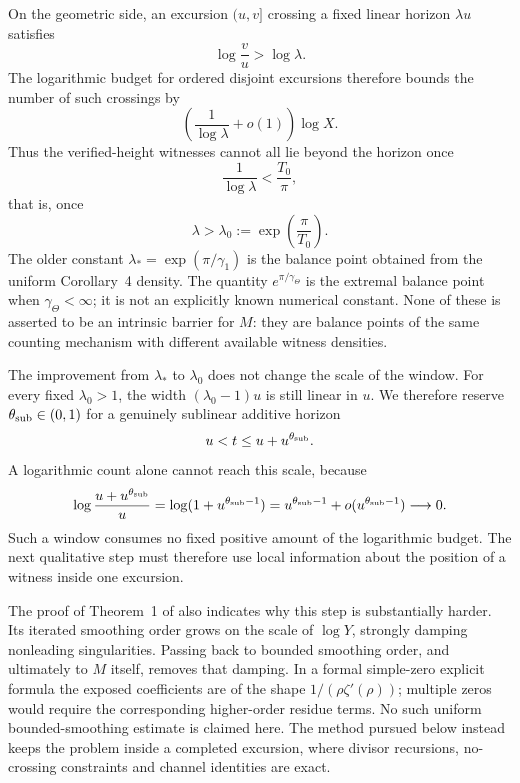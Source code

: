 \documentclass[11pt,reqno]{amsart}
\makeatletter
\let\CG@origcite\cite
\renewcommand*{\cite}[2][]{\def\CG@citekey{#2}%
  \ifx\relax#1\relax\CG@origcite{#2}\else\CG@origcite[#1]{#2}\fi}
\numberwithin{equation}{section}
\theoremstyle{plain}
\theoremstyle{definition}
\theoremstyle{remark}
\makeatother
\begin{document}
On the geometric side, an excursion $(u,v]$ crossing a fixed linear horizon
$\lambda u$ satisfies
\begin{equation}
 \log\frac vu>\log\lambda.
\end{equation}
The logarithmic budget for ordered disjoint excursions therefore bounds the
number of such crossings by
\begin{equation}
 \left(\frac1{\log\lambda}+o(1)\right)\log X.
\end{equation}
Thus the verified-height witnesses cannot all lie beyond the horizon once
\begin{equation}
 \frac1{\log\lambda}<\frac{T_0}{\pi},
\end{equation}
that is, once
\begin{equation}
 \lambda>\lambda_0:=\exp\!\left(\frac{\pi}{T_0}\right).
\end{equation}
The older constant
$\lambda_*=\exp(\pi/\gamma_1)$ is the balance point obtained from the
uniform Corollary~4 density.  The quantity $e^{\pi/\gamma_\Theta}$ is the
extremal balance point when $\gamma_\Theta<\infty$; it is not an explicitly
known numerical constant.  None of these is asserted to be an intrinsic
barrier for $M$: they are balance points of the same counting mechanism with
different available witness densities.

The improvement from $\lambda_*$ to $\lambda_0$ does not change the scale of
the window.  For every fixed $\lambda_0>1$, the width
$(\lambda_0-1)u$ is still linear in $u$.  We therefore reserve
$\theta_{\rm sub}\in(0,1)$ for a genuinely sublinear additive horizon
\begin{equation}
 u<t\le u+u^{\theta_{\rm sub}}.
\end{equation}
A logarithmic count alone cannot reach this scale, because
\begin{equation}
 \log\frac{u+u^{\theta_{\rm sub}}}{u}
 =\log(1+u^{\theta_{\rm sub}-1})
 =u^{\theta_{\rm sub}-1}+o(u^{\theta_{\rm sub}-1})\longrightarrow0.
\end{equation}
Such a window consumes no fixed positive amount of the logarithmic budget.
The next qualitative step must therefore use local information about the
position of a witness inside one excursion.

The proof of Theorem~1 of \cite{KP86} also indicates why this step is
substantially harder.  Its iterated smoothing order grows on the scale of
$\log Y$, strongly damping nonleading singularities.  Passing back to
bounded smoothing order, and ultimately to $M$ itself, removes that damping.
In a formal simple-zero explicit formula the exposed coefficients are of the
shape $1/(\rho\zeta'(\rho))$; multiple zeros would require the corresponding
higher-order residue terms.  No such uniform bounded-smoothing estimate is
claimed here.  The method pursued below instead keeps the problem inside a
completed excursion, where divisor recursions, no-crossing constraints and
channel identities are exact.
\end{document}
